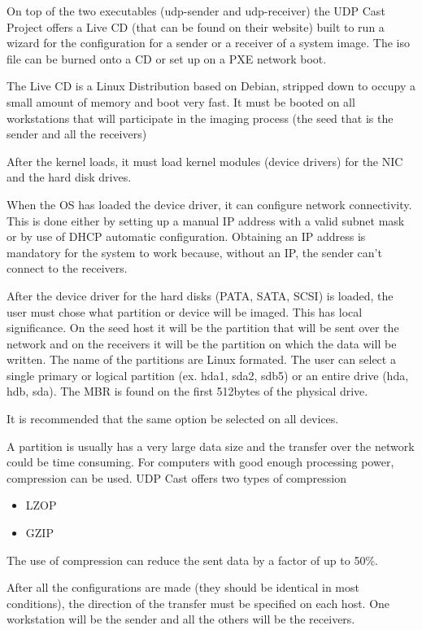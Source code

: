 On top of the two executables (udp-sender and udp-receiver) the UDP Cast
Project offers a Live CD (that can be found on their website) built to run
a wizard for the configuration for a sender or a receiver of a system
image. The iso file can be burned onto a CD or set up on a PXE network
boot.

The Live CD is a Linux Distribution based on Debian, stripped down to
occupy a small amount of memory and boot very fast. It must be booted on
all workstations that will participate in the imaging process (the seed
that is the sender and all the receivers)

After the kernel loads, it must load kernel modules (device drivers)
for the \ac{NIC} and the hard disk drives.


When the \ac{OS} has loaded the device driver, it can configure
network connectivity. This is done either by setting up a manual IP address
with a valid subnet mask or by use of \ac{DHCP} automatic configuration.
Obtaining an IP address is mandatory for the system to work because,
without an IP, the sender can't connect to the receivers.



After the device driver for the hard disks (PATA, SATA, SCSI) is loaded,
the user must chose what partition or device will be imaged. This has local
significance. On the seed host it will be the partition that will be sent over
the network and on the receivers it will be the partition on which the data
will be written. The name of the partitions are Linux formated. The user
can select a single primary or logical partition (ex. hda1, sda2, sdb5) or
an entire drive (hda, hdb, sda). The \ac{MBR} is found on the first 512bytes of
the physical drive.

It is recommended that the same option be selected on all devices.



A partition is usually has a very large data size and the transfer over the
network could be time consuming. For computers with good enough processing
power, compression can be used. UDP Cast offers two types of compression
\begin{itemize}
\item \ac{LZOP}
\item \ac{GZIP}
\end{itemize}

The use of compression can reduce the sent data by a factor of up to 50\%.


After all the configurations are made (they should be identical in most
conditions), the direction of the transfer must be specified on each host.
One workstation will be the sender and all the others will be the
receivers.


